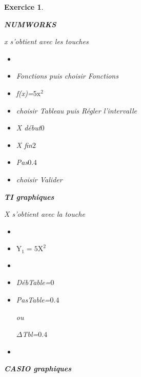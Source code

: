 \documentclass[10pt]{article}
\newtheorem{exo}{Exercice}
\begin{document}
\begin{exo}
\begin{enumerate}
\begin{multicols}{4}
\columnbreak

\begin{center}\textbf{NUMWORKS}\end{center}

\medskip

x s'obtient avec les touches    

\begin{itemize}
\item[\textbullet] \fbox{\textcolor{yellow}{\faHome}}
\item[\textbullet] Fonctions  puis choisir Fonctions 
\item[\textbullet] f(x)=$5\text{x}^2$ 
\item[\textbullet] choisir Tableau  puis Régler l'intervalle 

\item[\textbullet] X début\qquad$0$ 
\item[\textbullet] X fin\qquad $2$ 
\item[\textbullet] Pas\qquad $0.4$ 
\item[\textbullet] choisir Valider
\end{itemize}

\columnbreak

\begin{center}\textbf{TI graphiques}\end{center}

\medskip


X s'obtient avec la touche 
\begin{itemize}
\item[\textbullet] 
\item[\textbullet] $\text{Y}_1=5\text{X}^2$ 
\item[\textbullet]  
\item[\textbullet] DébTable=$0$ 
\item[\textbullet] PasTable=$0.4$ 

ou

\tiny{$\Delta$}\normalsize Tbl=$0.4$ 
\item[\textbullet]  
\end{itemize}

\columnbreak

\begin{center}\textbf{CASIO graphiques}\end{center}


\end{multicols}
\end{enumerate}
\end{exo}
\end{document}
